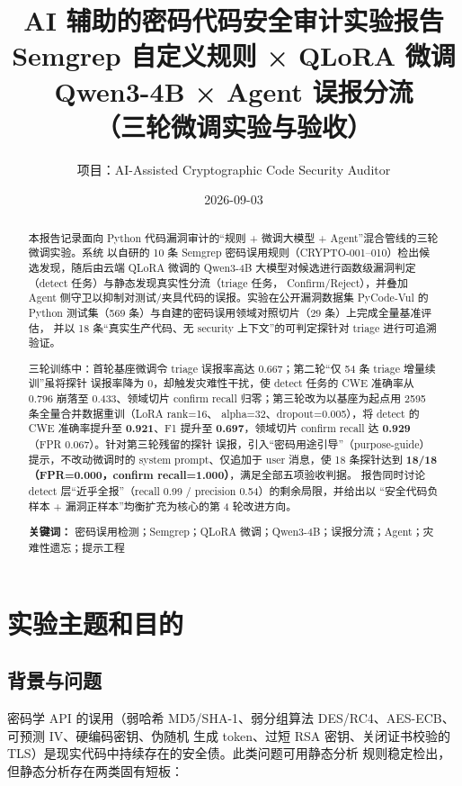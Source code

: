 \documentclass[11pt,a4paper,fontset=none]{ctexart}
\title{\textbf{AI 辅助的密码代码安全审计实验报告}\\[6pt]
  \large Semgrep 自定义规则 × QLoRA 微调 Qwen3-4B × Agent 误报分流\\
  （三轮微调实验与验收）}
\author{项目：AI-Assisted Cryptographic Code Security Auditor}
\date{2026-09-03}
\begin{document}
\maketitle
\vspace{-1.4em}

\begin{abstract}
本报告记录面向 Python 代码漏洞审计的“规则 + 微调大模型 + Agent”混合管线的三轮微调实验。系统
以自研的 10 条 Semgrep 密码误用规则（CRYPTO-001--010）检出候选发现，随后由云端 QLoRA 微调的
Qwen3-4B 大模型对候选进行函数级漏洞判定（detect 任务）与静态发现真实性分流（triage 任务，
Confirm/Reject），并叠加 Agent 侧守卫以抑制对测试/夹具代码的误报。实验在公开漏洞数据集
PyCode-Vul 的 Python 测试集（569 条）与自建的密码误用领域对照切片（29 条）上完成全量基准评估，
并以 18 条“真实生产代码、无 security 上下文”的可判定探针对 triage 进行可追溯验证。

三轮训练中：首轮基座微调令 triage 误报率高达 0.667；第二轮“仅 54 条 triage 增量续训”虽将探针
误报率降为 0，却触发灾难性干扰，使 detect 任务的 CWE 准确率从 0.796 崩落至 0.433、领域切片
confirm recall 归零；第三轮改为以基座为起点用 2595 条全量合并数据重训（LoRA rank=16、
alpha=32、dropout=0.005），将 detect 的 CWE 准确率提升至 \textbf{0.921}、F1 提升至
\textbf{0.697}，领域切片 confirm recall 达 \textbf{0.929}（FPR 0.067）。针对第三轮残留的探针
误报，引入“密码用途引导”（purpose-guide）提示，不改动微调时的 system prompt、仅追加于 user
消息，使 18 条探针达到 \textbf{18/18（FPR=0.000，confirm recall=1.000）}，满足全部五项验收判据。
报告同时讨论 detect 层“近乎全报”（recall 0.99 / precision 0.54）的剩余局限，并给出以
“安全代码负样本 + 漏洞正样本”均衡扩充为核心的第 4 轮改进方向。

\medskip
\noindent\textbf{关键词：} 密码误用检测；Semgrep；QLoRA 微调；Qwen3-4B；误报分流；Agent；灾难性遗忘；提示工程
\end{abstract}

\tableofcontents
\newpage

\section{实验主题和目的}
\label{sec:topic}

\subsection{背景与问题}
密码学 API 的误用（弱哈希 MD5/SHA-1、弱分组算法 DES/RC4、AES-ECB、可预测 IV、硬编码密钥、伪随机
生成 token、过短 RSA 密钥、关闭证书校验的 TLS）是现实代码中持续存在的安全债。此类问题可用静态分析
规则稳定检出，但静态分析存在两类固有短板：
\end{document}

